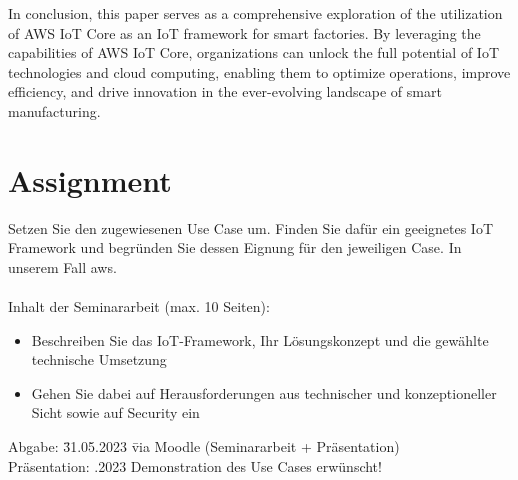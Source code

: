 In conclusion, this paper serves as a comprehensive exploration of the utilization of AWS IoT Core as an IoT framework for smart factories. By leveraging the capabilities of AWS IoT Core, organizations can unlock the full potential of IoT technologies and cloud computing, enabling them to optimize operations, improve efficiency, and drive innovation in the ever-evolving landscape of smart manufacturing.

\section{Assignment}
Setzen Sie den zugewiesenen Use Case um.
Finden Sie dafür ein geeignetes IoT Framework und begründen Sie dessen Eignung für den jeweiligen Case. In unserem Fall \ac{aws}.\\
\\
Inhalt der Seminararbeit (max. 10 Seiten):
\begin{itemize}
    \item Beschreiben Sie das IoT-Framework, Ihr Lösungskonzept und die gewählte technische Umsetzung
    \item Gehen Sie dabei auf Herausforderungen aus technischer und konzeptioneller Sicht sowie auf Security ein
\end{itemize}

\begin{tabbing}
	Abgabe: \hspace{3em} \= 31.05.2023 \hspace{.3em} \= via Moodle (Seminararbeit + Präsentation)\\
	Präsentation: .2023 \> Demonstration des Use Cases erwünscht!
\end{tabbing}



